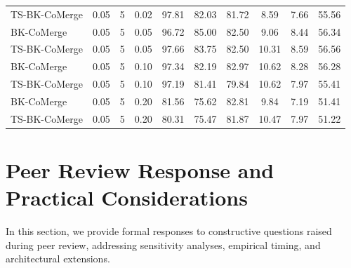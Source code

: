 \documentclass{article}
\theoremstyle{plain}
\theoremstyle{definition}
\theoremstyle{remark}
\begin{document}
\begin{table}[h]
\begin{center}
\begin{small}
\begin{tabular}{lccccccccc}
TS-BK-CoMerge & 0.05 & 5 & 0.02 & 97.81 & 82.03 & 81.72 & 8.59 & 7.66 & 55.56 \\
BK-CoMerge & 0.05 & 5 & 0.05 & 96.72 & 85.00 & 82.50 & 9.06 & 8.44 & 56.34 \\
TS-BK-CoMerge & 0.05 & 5 & 0.05 & 97.66 & 83.75 & 82.50 & 10.31 & 8.59 & 56.56 \\
BK-CoMerge & 0.05 & 5 & 0.10 & 97.34 & 82.19 & 82.97 & 10.62 & 8.28 & 56.28 \\
TS-BK-CoMerge & 0.05 & 5 & 0.10 & 97.19 & 81.41 & 79.84 & 10.62 & 7.97 & 55.41 \\
BK-CoMerge & 0.05 & 5 & 0.20 & 81.56 & 75.62 & 82.81 & 9.84 & 7.19 & 51.41 \\
TS-BK-CoMerge & 0.05 & 5 & 0.20 & 80.31 & 75.47 & 81.87 & 10.47 & 7.97 & 51.22 \\
\bottomrule
\end{tabular}
\end{small}
\end{center}
\vskip -0.1in
\end{table}

\section{Peer Review Response and Practical Considerations}
\label{sec:review_response}

In this section, we provide formal responses to constructive questions raised during peer review, addressing sensitivity analyses, empirical timing, and architectural extensions.
\end{document}
